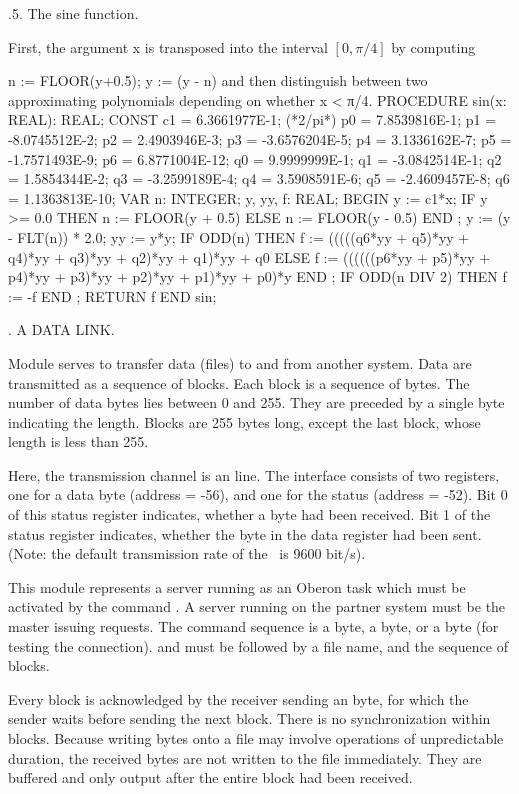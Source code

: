 .5. The sine function.


First, the argument x is transposed into the interval $[0, \pi/4]$ by computing

n := FLOOR(y+0.5); y := (y - n)
and then distinguish between two approximating polynomials depending on whether x < π/4.
PROCEDURE sin(x: REAL): REAL; CONST c1 = 6.3661977E-1; (*2/pi*)
p0 = 7.8539816E-1; p1 = -8.0745512E-2; p2 = 2.4903946E-3; p3 = -3.6576204E-5; p4 = 3.1336162E-7; p5 = -1.7571493E-9; p6 = 6.8771004E-12; q0 = 9.9999999E-1; q1 = -3.0842514E-1; q2 = 1.5854344E-2; q3 = -3.2599189E-4; q4 = 3.5908591E-6; q5 = -2.4609457E-8; q6 = 1.1363813E-10;
VAR n: INTEGER; y, yy, f: REAL; BEGIN y := c1*x;
IF y >= 0.0 THEN n := FLOOR(y + 0.5) ELSE n := FLOOR(y - 0.5) END ;
y := (y - FLT(n)) * 2.0; yy := y*y;
IF ODD(n) THEN f := (((((q6*yy + q5)*yy + q4)*yy + q3)*yy + q2)*yy + q1)*yy + q0 ELSE f := ((((((p6*yy + p5)*yy + p4)*yy + p3)*yy + p2)*yy + p1)*yy + p0)*y
END ;
IF ODD(n DIV 2) THEN f := -f END ;
RETURN f
END sin;

. A DATA LINK.

Module  serves to transfer data (files) to and from another system. Data are transmitted as a sequence of blocks. Each block is a sequence of bytes. The number of data bytes lies between 0 and 255. They are preceded by a single byte indicating the length. Blocks are 255 bytes long, except the last block, whose length is less than 255.

Here, the transmission channel is an  line. The interface consists of two registers, one for a data byte (address = -56), and one for the status (address = -52). Bit 0 of this status register indicates, whether a byte had been received. Bit 1 of the status register indicates, whether the byte in the data register had been sent. (Note: the default transmission rate of the \RISC\ is 9600 bit/s).

This module represents a server running as an Oberon task which must be activated by the command . A server running on the partner system must be the master issuing requests. The command sequence is a  byte, a  byte, or a  byte (for testing the connection).  and  must be followed by a file name, and the sequence of blocks.

Every block is acknowledged by the receiver sending an  byte, for which the sender waits before sending the next block. There is no synchronization within blocks. Because writing bytes onto a file may involve operations of unpredictable duration, the received bytes are not written to the file immediately. They are buffered and only output after the entire block had been received.
\begintt

